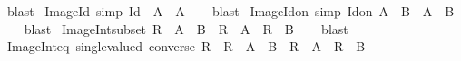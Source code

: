\begin{isabellebody}
%
\isadelimproof
%
\endisadelimproof
%
\isatagproof
{}\isamarkupfalse%
\ blast%
\endisatagproof
{\isafoldproof}%
%
\isadelimproof
\isanewline
%
\endisadelimproof
\isanewline
{}\isamarkupfalse%
\ Image{\isacharunderscore}{\kern0pt}Id\ {\isacharbrackleft}{\kern0pt}simp{\isacharbrackright}{\kern0pt}{\isacharcolon}{\kern0pt}\ {\isachardoublequoteopen}Id\ {\isacharbackquote}{\kern0pt}{\isacharbackquote}{\kern0pt}\ A\ {\isacharequal}{\kern0pt}\ A{\isachardoublequoteclose}\isanewline
%
\isadelimproof
\ \ %
\endisadelimproof
%
\isatagproof
{}\isamarkupfalse%
\ blast%
\endisatagproof
{\isafoldproof}%
%
\isadelimproof
\isanewline
%
\endisadelimproof
\isanewline
{}\isamarkupfalse%
\ Image{\isacharunderscore}{\kern0pt}Id{\isacharunderscore}{\kern0pt}on\ {\isacharbrackleft}{\kern0pt}simp{\isacharbrackright}{\kern0pt}{\isacharcolon}{\kern0pt}\ {\isachardoublequoteopen}Id{\isacharunderscore}{\kern0pt}on\ A\ {\isacharbackquote}{\kern0pt}{\isacharbackquote}{\kern0pt}\ B\ {\isacharequal}{\kern0pt}\ A\ {\isasyminter}\ B{\isachardoublequoteclose}\isanewline
%
\isadelimproof
\ \ %
\endisadelimproof
%
\isatagproof
{}\isamarkupfalse%
\ blast%
\endisatagproof
{\isafoldproof}%
%
\isadelimproof
\isanewline
%
\endisadelimproof
\isanewline
{}\isamarkupfalse%
\ Image{\isacharunderscore}{\kern0pt}Int{\isacharunderscore}{\kern0pt}subset{\isacharcolon}{\kern0pt}\ {\isachardoublequoteopen}R\ {\isacharbackquote}{\kern0pt}{\isacharbackquote}{\kern0pt}\ {\isacharparenleft}{\kern0pt}A\ {\isasyminter}\ B{\isacharparenright}{\kern0pt}\ {\isasymsubseteq}\ R\ {\isacharbackquote}{\kern0pt}{\isacharbackquote}{\kern0pt}\ A\ {\isasyminter}\ R\ {\isacharbackquote}{\kern0pt}{\isacharbackquote}{\kern0pt}\ B{\isachardoublequoteclose}\isanewline
%
\isadelimproof
\ \ %
\endisadelimproof
%
\isatagproof
{}\isamarkupfalse%
\ blast%
\endisatagproof
{\isafoldproof}%
%
\isadelimproof
\isanewline
%
\endisadelimproof
\isanewline
{}\isamarkupfalse%
\ Image{\isacharunderscore}{\kern0pt}Int{\isacharunderscore}{\kern0pt}eq{\isacharcolon}{\kern0pt}\ {\isachardoublequoteopen}single{\isacharunderscore}{\kern0pt}valued\ {\isacharparenleft}{\kern0pt}converse\ R{\isacharparenright}{\kern0pt}\ {\isasymLongrightarrow}\ R\ {\isacharbackquote}{\kern0pt}{\isacharbackquote}{\kern0pt}\ {\isacharparenleft}{\kern0pt}A\ {\isasyminter}\ B{\isacharparenright}{\kern0pt}\ {\isacharequal}{\kern0pt}\ R\ {\isacharbackquote}{\kern0pt}{\isacharbackquote}{\kern0pt}\ A\ {\isasyminter}\ R\ {\isacharbackquote}{\kern0pt}{\isacharbackquote}{\kern0pt}\ B{\isachardoublequoteclose}\isanewline

\end{isabellebody}
